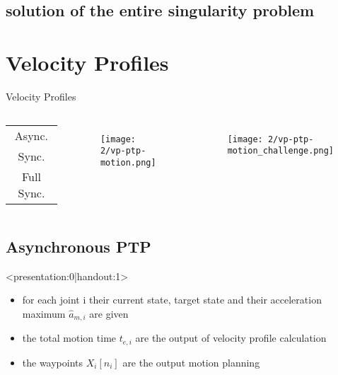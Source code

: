 \documentclass[%
  professionalfonts,%
  xcolor={%
    usenames,%
    dvipsnames,%
    svgnames,%
    table,%
    hyperref%
  }%
]{beamer}
\begin{document}
\begin{frame}[fragile]

\end{frame}

\subsection{solution of the entire singularity problem}
\begin{frame}[fragile]

\end{frame}


\section{Velocity Profiles}
\begin{frame}{Velocity Profiles}
  \begin{columns}
	\renewcommand{\arraystretch}{3.5}
	\begin{tabular}{c}
		Async. \\ 
		Sync. \\ 
		Full Sync.
	\end{tabular} 
    \begin{figure}[h]
      \texttt{[image: 2/vp-ptp-motion.png]}
      \label{fig:vp-ptp-motion}
    \end{figure}
    \begin{figure}[h]
      \texttt{[image: 2/vp-ptp-motion\_challenge.png]}
      \label{fig:vp-ptp-motion_challenge}
    \end{figure}
  \end{columns}
\end{frame}

\subsection{Asynchronous PTP}
\begin{frame}<presentation:0|handout:1>
\begin{itemize}
\item for each joint i their current state, target state and their acceleration maximum $\hat{a}_{m,i}$ are given
\item the total motion time $t_{e,i}$ are the output of velocity profile calculation
\item the waypoints $X_{i}[n_{i}]$ are the output motion planning
\end{itemize}
\end{frame}
\end{document}
